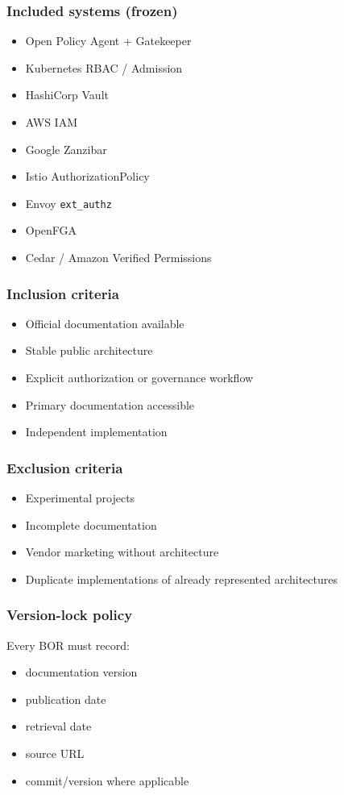 \subsubsection{Included systems (frozen)}
\begin{itemize}
  \item Open Policy Agent + Gatekeeper
  \item Kubernetes RBAC / Admission
  \item HashiCorp Vault
  \item AWS IAM
  \item Google Zanzibar
  \item Istio AuthorizationPolicy
  \item Envoy \texttt{ext\_authz}
  \item OpenFGA
  \item Cedar / Amazon Verified Permissions
\end{itemize}

\subsubsection{Inclusion criteria}
\begin{itemize}
  \item Official documentation available
  \item Stable public architecture
  \item Explicit authorization or governance workflow
  \item Primary documentation accessible
  \item Independent implementation
\end{itemize}

\subsubsection{Exclusion criteria}
\begin{itemize}
  \item Experimental projects
  \item Incomplete documentation
  \item Vendor marketing without architecture
  \item Duplicate implementations of already represented architectures
\end{itemize}

\subsubsection{Version-lock policy}
Every BOR must record:
\begin{itemize}
  \item documentation version
  \item publication date
  \item retrieval date
  \item source URL
  \item commit/version where applicable
\end{itemize}

